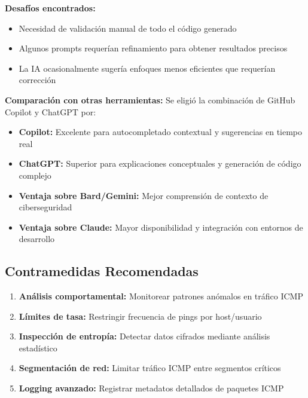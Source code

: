 \documentclass[letter,12pt]{article}
\begin{document}
\textbf{Desafíos encontrados:}
\begin{itemize}
    \item Necesidad de validación manual de todo el código generado
    
    \item Algunos prompts requerían refinamiento para obtener resultados precisos
    
    \item La IA ocasionalmente sugería enfoques menos eficientes que requerían corrección
\end{itemize}

\textbf{Comparación con otras herramientas:}
Se eligió la combinación de GitHub Copilot y ChatGPT por:
\begin{itemize}
    \item \textbf{Copilot:} Excelente para autocompletado contextual y sugerencias en tiempo real
    
    \item \textbf{ChatGPT:} Superior para explicaciones conceptuales y generación de código complejo
    
    \item \textbf{Ventaja sobre Bard/Gemini:} Mejor comprensión de contexto de ciberseguridad
    
    \item \textbf{Ventaja sobre Claude:} Mayor disponibilidad y integración con entornos de desarrollo
\end{itemize}

\subsection*{Contramedidas Recomendadas}

\begin{enumerate}
    \item \textbf{Análisis comportamental:} Monitorear patrones anómalos en tráfico ICMP
    
    \item \textbf{Límites de tasa:} Restringir frecuencia de pings por host/usuario
    
    \item \textbf{Inspección de entropía:} Detectar datos cifrados mediante análisis estadístico
    
    \item \textbf{Segmentación de red:} Limitar tráfico ICMP entre segmentos críticos
    
    \item \textbf{Logging avanzado:} Registrar metadatos detallados de paquetes ICMP
\end{enumerate}
\end{document}
